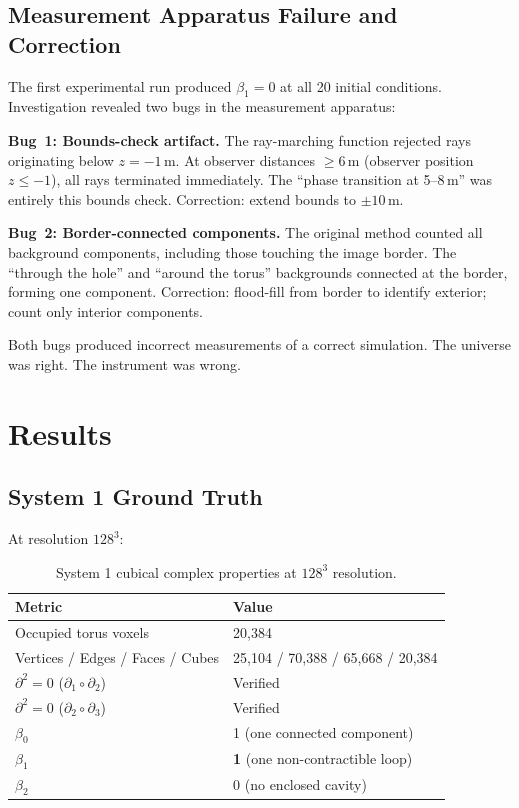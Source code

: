 \documentclass[11pt,a4paper]{article}
\theoremstyle{remark}
\begin{document}
\subsection{Measurement Apparatus Failure and Correction}
\label{sec:failure}

The first experimental run produced $\beta_1 = 0$ at all 20 initial conditions. Investigation revealed two bugs in the measurement apparatus:

\textbf{Bug~1: Bounds-check artifact.} The ray-marching function rejected rays originating below $z = -1$\,m. At observer distances $\geq 6$\,m (observer position $z \leq -1$), all rays terminated immediately. The ``phase transition at 5--8\,m'' was entirely this bounds check. Correction: extend bounds to $\pm 10$\,m.

\textbf{Bug~2: Border-connected components.} The original method counted all background components, including those touching the image border. The ``through the hole'' and ``around the torus'' backgrounds connected at the border, forming one component. Correction: flood-fill from border to identify exterior; count only interior components.

Both bugs produced incorrect measurements of a correct simulation. The universe was right. The instrument was wrong.

\section{Results}
\label{sec:results}

\subsection{System 1 Ground Truth}

At resolution $128^3$:

\begin{table}[H]
\centering
\caption{System 1 cubical complex properties at $128^3$ resolution.}
\label{tab:groundtruth}
\begin{tabular}{ll}
\toprule
\textbf{Metric} & \textbf{Value} \\
\midrule
Occupied torus voxels & 20,384 \\
Vertices / Edges / Faces / Cubes & 25,104 / 70,388 / 65,668 / 20,384 \\
$\partial^2 = 0$ ($\partial_1 \circ \partial_2$) & Verified \\
$\partial^2 = 0$ ($\partial_2 \circ \partial_3$) & Verified \\
$\beta_0$ & 1 (one connected component) \\
$\beta_1$ & \textbf{1} (one non-contractible loop) \\
$\beta_2$ & 0 (no enclosed cavity) \\
\bottomrule
\end{tabular}
\end{table}
\end{document}
